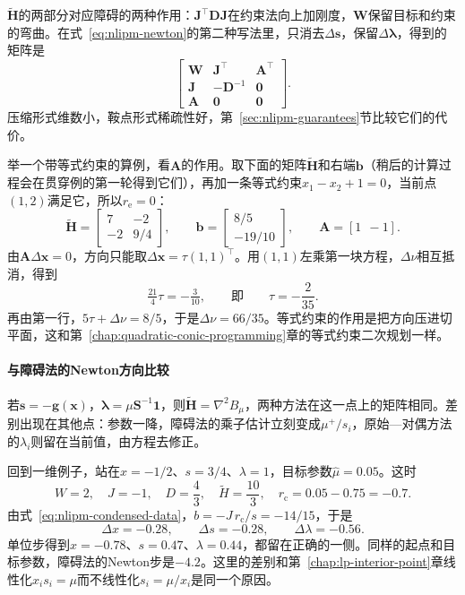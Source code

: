 $\tilde{\bm{H}}$的两部分对应障碍的两种作用：$\bm{J}^\top\bm{D}\bm{J}$在约束法向上加刚度，$\bm{W}$保留目标和约束的弯曲。在式~\eqref{eq:nlipm-newton}的第二种写法里，只消去$\Delta\bm{s}$，保留$\Delta\bm{\lambda}$，得到的矩阵是
\begin{equation}
 \begin{bmatrix}\bm{W}&\bm{J}^\top&\bm{A}^\top\\\bm{J}&-\bm{D}^{-1}&\bm{0}\\\bm{A}&\bm{0}&\bm{0}\end{bmatrix}.
 \label{eq:nlipm-saddle}
\end{equation}
压缩形式维数小，鞍点形式稀疏性好，第~\ref{sec:nlipm-guarantees}节比较它们的代价。

举一个带等式约束的算例，看$\bm{A}$的作用。取下面的矩阵$\tilde{\bm{H}}$和右端$\bm{b}$（稍后的计算过程会在贯穿例的第一轮得到它们），再加一条等式约束$x_1-x_2+1=0$，当前点$(1,2)$满足它，所以$r_{\mathrm{e}}=0$：
\[
 \tilde{\bm{H}}=\begin{bmatrix}7&-2\\-2&9/4\end{bmatrix},\qquad\bm{b}=\begin{bmatrix}8/5\\-19/10\end{bmatrix},\qquad\bm{A}=[1\ \ -1].
\]
由$\bm{A}\Delta\bm{x}=0$，方向只能取$\Delta\bm{x}=\tau(1,1)^\top$。用$(1,1)$左乘第一块方程，$\Delta\nu$相互抵消，得到
\[
 \tfrac{21}{4}\tau=-\tfrac{3}{10},\qquad\text{即}\qquad\tau=-\frac{2}{35}.
\]
再由第一行，$5\tau+\Delta\nu=8/5$，于是$\Delta\nu=66/35$。等式约束的作用是把方向压进切平面，这和第~\ref{chap:quadratic-conic-programming}章的等式约束二次规划一样。

\paragraph{与障碍法的Newton方向比较}
若$\bm{s}=-\bm{g}(\bm{x})$，$\bm{\lambda}=\mu\bm{S}^{-1}\bm{1}$，则$\tilde{\bm{H}}=\nabla^2B_\mu$，两种方法在这一点上的矩阵相同。差别出现在其他点：参数一降，障碍法的乘子估计立刻变成$\mu^+/s_i$，原始—对偶方法的$\lambda_i$则留在当前值，由方程去修正。

回到一维例子，站在$x=-1/2$、$s=3/4$、$\lambda=1$，目标参数$\hat{\mu}=0.05$。这时
\[
 W=2,\quad J=-1,\quad D=\frac43,\quad\tilde{H}=\frac{10}{3},\quad r_{\mathrm{c}}=0.05-0.75=-0.7.
\]
由式~\eqref{eq:nlipm-condensed-data}，$b=-J\,r_{\mathrm{c}}/s=-14/15$，于是
\[
 \Delta x=-0.28,\qquad\Delta s=-0.28,\qquad\Delta\lambda=-0.56.
\]
单位步得到$x=-0.78$、$s=0.47$、$\lambda=0.44$，都留在正确的一侧。同样的起点和目标参数，障碍法的Newton步是$-4.2$。这里的差别和第~\ref{chap:lp-interior-point}章线性化$x_is_i=\mu$而不线性化$s_i=\mu/x_i$是同一个原因。

